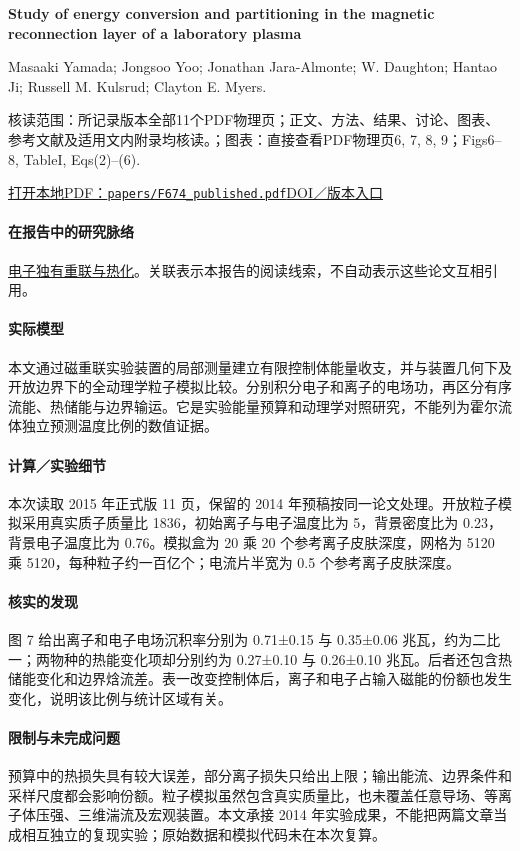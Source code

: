 \textbf{Study of energy conversion and partitioning in the magnetic reconnection layer of a laboratory plasma}\citep{F674}\

Masaaki Yamada;  Jongsoo Yoo;  Jonathan Jara-Almonte;  W. Daughton;  Hantao Ji;  Russell M. Kulsrud;  Clayton E. Myers.

\textsf{核读范围：}所记录版本全部11个PDF物理页；正文、方法、结果、讨论、图表、参考文献及适用文内附录均核读。；\textsf{图表：}直接查看PDF物理页6, 7, 8, 9；Figs6–8,  TableI,  Eqs(2)–(6).

\href{run:papers/F674_published.pdf}{打开本地PDF：\texttt{papers/F674\_published.pdf}}\quad\href{https://doi.org/10.1063/1.4920960}{DOI／版本入口}

\paragraph{在报告中的研究脉络}\hyperref[story:energy]{电子独有重联与热化}。关联表示本报告的阅读线索，不自动表示这些论文互相引用。

\paragraph{实际模型}本文通过磁重联实验装置的局部测量建立有限控制体能量收支，并与装置几何下及开放边界下的全动理学粒子模拟比较。分别积分电子和离子的电场功，再区分有序流能、热储能与边界输运。它是实验能量预算和动理学对照研究，不能列为霍尔流体独立预测温度比例的数值证据。

\paragraph{计算／实验细节}本次读取 2015 年正式版 11 页，保留的 2014 年预稿按同一论文处理。开放粒子模拟采用真实质子质量比 1836，初始离子与电子温度比为 5，背景密度比为 0.23，背景电子温度比为 0.76。模拟盒为 20 乘 20 个参考离子皮肤深度，网格为 5120 乘 5120，每种粒子约一百亿个；电流片半宽为 0.5 个参考离子皮肤深度。

\paragraph{核实的发现}图 7 给出离子和电子电场沉积率分别为 0.71±0.15 与 0.35±0.06 兆瓦，约为二比一；两物种的热能变化项却分别约为 0.27±0.10 与 0.26±0.10 兆瓦。后者还包含热储能变化和边界焓流差。表一改变控制体后，离子和电子占输入磁能的份额也发生变化，说明该比例与统计区域有关。

\paragraph{限制与未完成问题}预算中的热损失具有较大误差，部分离子损失只给出上限；输出能流、边界条件和采样尺度都会影响份额。粒子模拟虽然包含真实质量比，也未覆盖任意导场、等离子体压强、三维湍流及宏观装置。本文承接 2014 年实验成果，不能把两篇文章当成相互独立的复现实验；原始数据和模拟代码未在本次复算。

